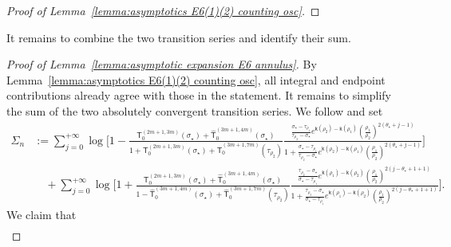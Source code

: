 \documentclass[a4paper]{article}
\numberwithin{equation}{section}
\begin{document}
\begin{proof}[Proof of Lemma~\ref{lemma:asymptotics E6(1)(2) counting osc}]

\end{proof}


It remains to combine the two transition series and identify their sum.

\begin{proof}[Proof of Lemma~\ref{lemma:asymptotic expansion E6 annulus}]
By Lemma~\ref{lemma:asymptotics E6(1)(2) counting osc}, all integral and
endpoint contributions already agree with those in the statement.  It remains
to simplify the sum of the two absolutely convergent transition series.  We
follow \cite[Lemma~2.7]{ACCL2} and set
\begin{align*}
\Sigma_n
&:=
\sum_{j=0}^{+\infty}
\log\bigg[
1-\frac{\mathsf{T}_{0}^{(2m+1,3m)}(\sigma_{\star})+\widehat{\mathsf{T}}_0^{(3m+1,4m)}(\sigma_{\star})}{1+\mathsf{T}_{0}^{(2m+1,3m)}(\sigma_{\star})
+\widehat{\mathsf{T}}_0^{(3m+1,7m)}(\tau_{\rho_2})}
\frac{\frac{\sigma_{\star}-\tau_{\rho_1}}{\tau_{\rho_2}-\sigma_{\star}}e^{\mathsf{k}(\rho_2)-\mathsf{k}(\rho_1)}(\tfrac{\rho_1}{\rho_2})^{2(\theta_{\star}+j-1)}}{1+\frac{\sigma_{\star}-\tau_{\rho_1}}{\tau_{\rho_2}-\sigma_{\star}}e^{\mathsf{k}(\rho_2)-\mathsf{k}(\rho_1)}(\tfrac{\rho_1}{\rho_2})^{2(\theta_{\star}+j-1)}}
\bigg]
\\
&\quad 
+
\sum_{j=0}^{+\infty}
\log\bigg[
1+\frac{\mathsf{T}_0^{(2m+1,3m)}(\sigma_{\star})+\widehat{\mathsf{T}}_0^{(3m+1,4m)}(\sigma_{\star})}{1-\widehat{\mathsf{T}}_0^{(3m+1,4m)}(\sigma_{\star})+\widehat{\mathsf{T}}_0^{(3m+1,7m)}(\tau_{\rho_2})}
\frac{
\frac{\tau_{\rho_2}-\sigma_{\star}}{\sigma_{\star}-\tau_{\rho_1}}
e^{\mathsf{k}(\rho_1)-\mathsf{k}(\rho_2)}
(\tfrac{\rho_1}{\rho_2})^{2(j-\theta_{\star}+1+1)}
}{
1+\frac{\tau_{\rho_2}-\sigma_{\star}}{\sigma_{\star}-\tau_{\rho_1}}e^{\mathsf{k}(\rho_1)-\mathsf{k}(\rho_2)}( \tfrac{\rho_1}{\rho_2})^{2(j-\theta_{\star}+1+1)}
}
\bigg]. 
\end{align*}
We claim that
\begin{align}

\end{align}
\end{proof}
\end{document}
